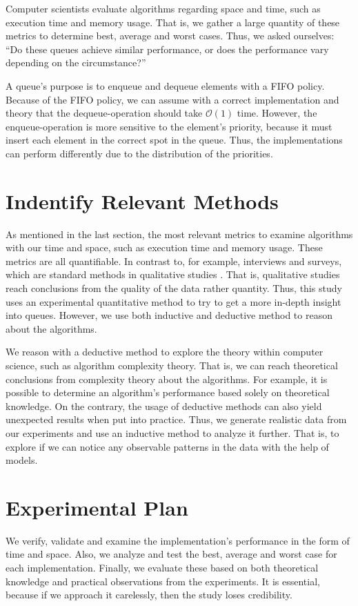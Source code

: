 \documentclass[a4paper,11pt]{kth-mag}
\newcommand*{\skippara}{\par\vspace{\baselineskip} \noindent}
\begin{document}
\skippara Computer scientists evaluate algorithms regarding space and time, such as execution time and memory usage.
That is, we gather a large quantity of these metrics to determine best, average and worst cases.
Thus, we asked ourselves: “Do these queues achieve similar performance, or does the performance vary depending on the circumstance?”

\skippara A queue's purpose is to enqueue and dequeue elements with a FIFO policy.
Because of the FIFO policy, we can assume with a correct implementation and theory that the dequeue-operation should take $\mathcal{O}(1)$ time.
However, the enqueue-operation is more sensitive to the element's priority, because it must insert each element in the correct spot in the queue.
Thus, the implementations can perform differently due to the distribution of the priorities.

\section{Indentify Relevant Methods}\label{sec:methods}
As mentioned in the last section, the most relevant metrics to examine algorithms with our time and space, such as execution time and memory usage.
These metrics are all quantifiable. In contrast to, for example, interviews and surveys, which are standard methods in qualitative studies \cite{Omexperi69:online, haakansson2013portal}.
That is, qualitative studies reach conclusions from the quality of the data rather quantity.
Thus, this study uses an experimental quantitative method to try to get a more in-depth insight into queues.
However, we use both inductive and deductive method to reason about the algorithms.

\skippara We reason with a deductive method to explore the theory within computer science, such as algorithm complexity theory.
That is, we can reach theoretical conclusions from complexity theory about the algorithms.
For example, it is possible to determine an algorithm's performance based solely on theoretical knowledge.
On the contrary, the usage of deductive methods can also yield unexpected results when put into practice.
Thus, we generate realistic data from our experiments and use an inductive method to analyze it further.
That is, to explore if we can notice any observable patterns in the data with the help of models.

\section{Experimental Plan}\label{sec:plan}
We verify, validate and examine the implementation's performance in the form of time and space.
Also, we analyze and test the best, average and worst case for each implementation.
Finally, we evaluate these based on both theoretical knowledge and practical observations from the experiments.
It is essential, because if we approach it carelessly, then the study loses credibility.
\end{document}
